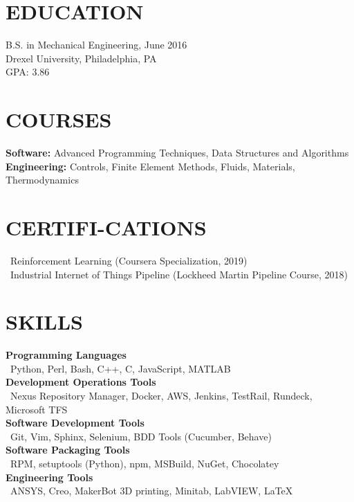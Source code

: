 \documentclass[line,resmargin,11pt]{res}
\begin{document}
\address{AGnias47@gmail.com}
 
\begin{resume}
 
\section{EDUCATION}
B.S. in Mechanical Engineering, June 2016 \\
Drexel University, Philadelphia, PA \\
GPA: 3.86 
\section{COURSES}
				\textbf{Software:} Advanced Programming Techniques, Data Structures and Algorithms \\
				\textbf{Engineering:} Controls, Finite Element Methods, Fluids, Materials, Thermodynamics
\section{CERTIFI-CATIONS}
				\textbullet\ Reinforcement Learning (Coursera Specialization, 2019) \\
				\textbullet\ Industrial Internet of Things Pipeline (Lockheed Martin Pipeline Course, 2018) 

\section{SKILLS}
\textbf{Programming Languages} \\
\textbullet\ Python, Perl, Bash, C++, C, JavaScript, MATLAB  \\
\textbf{Development Operations Tools} \\
\textbullet\ Nexus Repository Manager, Docker, AWS, Jenkins, TestRail, Rundeck, Microsoft TFS \\
\textbf{Software Development Tools} \\
\textbullet\ Git, Vim, Sphinx, Selenium, BDD Tools (Cucumber, Behave) \\
\textbf{Software Packaging Tools} \\
\textbullet\ RPM, setuptools (Python), npm, MSBuild, NuGet, Chocolatey \\
\textbf{Engineering Tools} \\
\textbullet\ ANSYS, Creo, MakerBot 3D printing, Minitab, LabVIEW, \LaTeX          
 

\end{resume}
\end{document}
